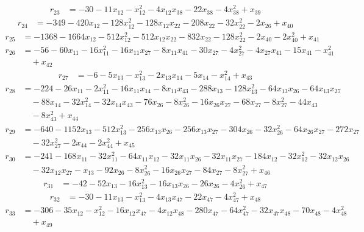\begin{align*}
r_{23}&=
-30-11x_{12}-x_{12}^{2}-4x_{12}x_{38}-22x_{38}-4x_{38}^{2}+x_{39}
\end{align*}
\begin{align*}
r_{24}&=
-349-420x_{12}-128x_{12}^{2}-128x_{12}x_{22}-208x_{22}-32x_{22}^{2}-2x_{26}+x_{40}
\end{align*}
\begin{align*}
r_{25}&=
-1368-1664x_{12}-512x_{12}^{2}-512x_{12}x_{22}-832x_{22}-128x_{22}^{2}-2x_{40}-2x_{40}^{2}+x_{41}
\end{align*}
\begin{align*}
r_{26}&=
-56-60x_{11}-16x_{11}^{2}-16x_{11}x_{27}-8x_{11}x_{41}-30x_{27}-4x_{27}^{2}-4x_{27}x_{41}-15x_{41}-x_{41}^{2} \\
&\quad +x_{42}
\end{align*}
\begin{align*}
r_{27}&=
-6-5x_{13}-x_{13}^{2}-2x_{13}x_{14}-5x_{14}-x_{14}^{2}+x_{43}
\end{align*}
\begin{align*}
r_{28}&=
-224-26x_{11}-2x_{11}^{2}-16x_{11}x_{14}-8x_{11}x_{43}-288x_{13}-128x_{13}^{2}-64x_{13}x_{26}-64x_{13}x_{27} \\
&\quad -88x_{14}-32x_{14}^{2}-32x_{14}x_{43}-76x_{26}-8x_{26}^{2}-16x_{26}x_{27}-68x_{27}-8x_{27}^{2}-44x_{43} \\
&\quad -8x_{43}^{2}+x_{44}
\end{align*}
\begin{align*}
r_{29}&=
-640-1152x_{13}-512x_{13}^{2}-256x_{13}x_{26}-256x_{13}x_{27}-304x_{26}-32x_{26}^{2}-64x_{26}x_{27}-272x_{27} \\
&\quad -32x_{27}^{2}-2x_{44}-2x_{44}^{2}+x_{45}
\end{align*}
\begin{align*}
r_{30}&=
-241-168x_{11}-32x_{11}^{2}-64x_{11}x_{12}-32x_{11}x_{26}-32x_{11}x_{27}-184x_{12}-32x_{12}^{2}-32x_{12}x_{26} \\
&\quad -32x_{12}x_{27}-x_{13}-92x_{26}-8x_{26}^{2}-16x_{26}x_{27}-84x_{27}-8x_{27}^{2}+x_{46}
\end{align*}
\begin{align*}
r_{31}&=
-42-52x_{13}-16x_{13}^{2}-16x_{13}x_{26}-26x_{26}-4x_{26}^{2}+x_{47}
\end{align*}
\begin{align*}
r_{32}&=
-30-11x_{13}-x_{13}^{2}-4x_{13}x_{47}-22x_{47}-4x_{47}^{2}+x_{48}
\end{align*}
\begin{align*}
r_{33}&=
-306-35x_{12}-x_{12}^{2}-16x_{12}x_{47}-4x_{12}x_{48}-280x_{47}-64x_{47}^{2}-32x_{47}x_{48}-70x_{48}-4x_{48}^{2} \\
&\quad +x_{49}
\end{align*}
